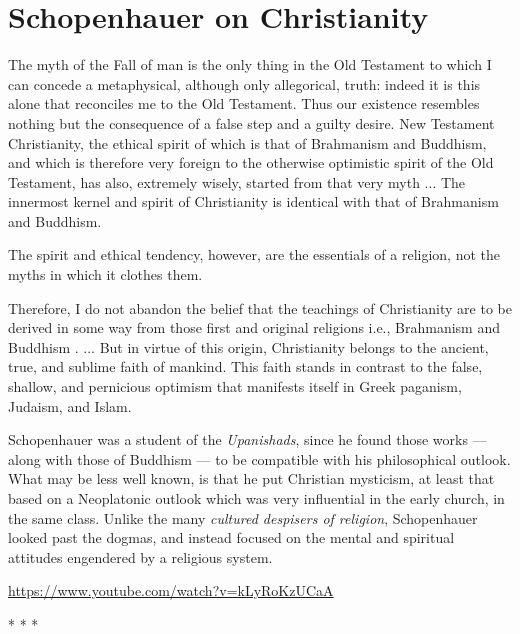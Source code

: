 \section{Schopenhauer on Christianity}

\begin{quotationx}
The myth of the Fall of man is the only thing in the Old Testament to which I can concede a metaphysical, although only allegorical, truth: indeed it is this alone that reconciles me to the Old Testament. Thus our existence resembles nothing but the consequence of a false step and a guilty desire. New Testament Christianity, the ethical spirit of which is that of Brahmanism and Buddhism, and which is therefore very foreign to the otherwise optimistic spirit of the Old Testament, has also, extremely wisely, started from that very myth ... The innermost kernel and spirit of Christianity is identical with that of Brahmanism and Buddhism.

The spirit and ethical tendency, however, are the essentials of a religion, not the myths in which it clothes them.

Therefore, I do not abandon the belief that the teachings of Christianity are to be derived in some way from those first and original religions i.e., Brahmanism and Buddhism . ... But in virtue of this origin, Christianity belongs to the ancient, true, and sublime faith of mankind. This faith stands in contrast to the false, shallow, and pernicious optimism that manifests itself in Greek paganism, Judaism, and Islam.


\end{quotationx}


Schopenhauer was a student of the \emph{Upanishads}, since he found those works --- along with those of Buddhism --- to be compatible with his philosophical outlook. What may be less well known, is that he put Christian mysticism, at least that based on a Neoplatonic outlook which was very influential in the early church, in the same class. Unlike the many \emph{cultured despisers of religion}, Schopenhauer looked past the dogmas, and instead focused on the mental and spiritual attitudes engendered by a religious system.

\url{https://www.youtube.com/watch?v=kLyRoKzUCaA} 


\begin{center}* * *\end{center}


